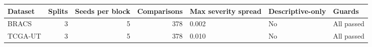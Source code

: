 \begin{tabular}{lrrrlll}
\toprule
Dataset & Splits & Seeds per block & Comparisons & Max severity spread & Descriptive-only & Guards \\
\midrule
BRACS & 3 & 5 & 378 & 0.002 & No & All passed \\
TCGA-UT & 3 & 5 & 378 & 0.010 & No & All passed \\
\bottomrule
\end{tabular}
